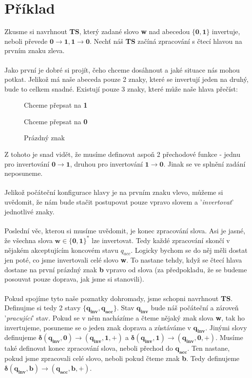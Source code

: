 \documentclass{report}
\begin{document}
\section{Příklad}
Zkusme si navrhnout \textbf{TS}, který zadané slovo \textbf{w} nad abecedou $\mathbf{\{0, 1\}}$ invertuje, neboli převede $\mathbf{0 \rightarrow 1 , 1 \rightarrow 0}$. Nechť náš \textbf{TS} začíná zpracování s čtecí hlavou na prvním znaku zleva.\\ \\ Jako první je dobré si projít, čeho chceme dosáhnout a jaké situace nás mohou potkat. Jelikož má naše abeceda pouze 2 znaky, které se invertují jeden na druhý, bude to celkem snadné. Existují pouze 3 znaky, které může naše hlava přečíst:
\begin{description}
        \item[] Chceme přepsat na \textbf{1}
        \item[] Chceme přepsat na \textbf{0}
        \item[] Prázdný znak
    \end{description}
Z tohoto je snad vidět, že musíme definovat aspoň 2 přechodové funkce - jednu pro invertování $\mathbf{0 \rightarrow 1}$, druhou pro invertování  $\mathbf{1 \rightarrow 0}$. Jinak se ve splnění zadání neposuneme.\\ \\ Jelikož počáteční konfigurace hlavy je na prvním znaku vlevo, můžeme si uvědomit, že nám bude stačit postupovat pouze vpravo slovem a '\textit{invertovat}' jednotlivé znaky.\\ \\Poslední věc, kterou si musíme uvědomit, je konec zpracování slova. Asi je jasné, že všechna slova $\mathbf{w \in \{0, 1\}^{*}}$ lze invertovat. Tedy každé zpracování skončí v nějakém akceptujícím koncovém stavu $q_{acc}$. Logicky bychom se do něj měli dostat jen poté, co jsme invertovali celé slovo \textbf{w}. To nastane tehdy, když se čtecí hlava dostane na první prázdný znak \textbf{b} vpravo od slova (za předpokladu, že se budeme posouvat pouze doprava, jak jsme si stanovili).\\ \\Pokud spojíme tyto naše poznatky dohromady, jsme schopni navrhnout \textbf{TS}. Definujme si tedy 2 stavy $\mathbf{\{q_{inv}, q_{acc}\}}$. Stav $\mathbf{q_{inv}}$ bude náš počáteční a zároveň '\textit{pracující}' stav. Pokud se v něm nacházíme a čteme nějaký znak slova \textbf{w}, tak ho invertujeme, posuneme se o jeden znak doprava a zůstáváme v $\mathbf{q_{inv}}$. Jinými slovy definujeme $\mathbf{\delta(q_{inv},0) \rightarrow (q_{inv},1,+)}$ a $\mathbf{\delta(q_{inv},1) \rightarrow (q_{inv},0,+)}$. Musíme také definovat konec zpracování slova, neboli přechod do $\mathbf{q_{acc}}$. Ten nastane, pokud jsme zpracovali celé slovo, neboli pokud čteme znak \textbf{b}. Tedy definujeme $\mathbf{\delta(q_{inv},b) \rightarrow (q_{acc},b,+)}$.
\end{document}
